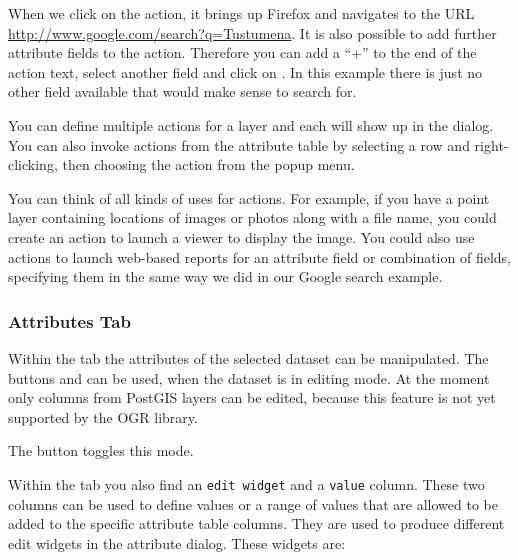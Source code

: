 When we click on the action, it brings up Firefox and navigates to the URL
\url{http://www.google.com/search?q=Tustumena}. It is also possible to add further 
attribute fields to the action. Therefore you can add a ``+'' to the end of the action 
text, select another field and click on . In this example there 
is just no other field available that would make sense to search for.

You can define multiple actions for a layer and each will show up in the
 dialog. You can also invoke actions from the attribute table
by selecting a row and right-clicking, then choosing the action from the popup
menu.

You can think of all kinds of uses for actions. For example, if you have a point layer
containing locations of images or photos along with a file name, you could
create an action to launch a viewer to display the image. You could also use
actions to launch web-based reports for an attribute field or combination of
fields, specifying them in the same way we did in our Google search example.

\subsubsection{Attributes Tab}\label{label_attributes}
Within the  tab the attributes of the selected dataset can be
manipulated. The buttons  and  can be
used, when the dataset is in editing mode. At the moment only columns from 
PostGIS layers can be edited, because this feature is not yet supported by 
the OGR library. 

The  button toggles this mode.


Within the  tab you also find an \texttt{edit widget} and a 
\texttt{value} column. These two columns can be used to define values or a range 
of values that are allowed to be added to the specific attribute table columns. 
They are used to produce different edit widgets in the attribute dialog. These 
widgets are:

